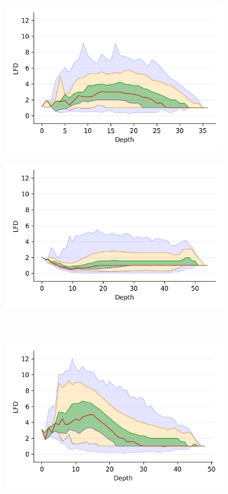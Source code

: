 \begin{figure}
    \captionsetup[subfigure]{aboveskip=-15pt,belowskip=-3pt}
    \begin{subfigure}[b]{0.47\textwidth}
        \includegraphics[width=0.9\textwidth]{images/lfd/fashion-mnist.png}\\
        \label{fig:results:fashion-mnist-lfd}
    \end{subfigure}%
    \begin{subfigure}[b]{0.47\textwidth}
        \includegraphics[width=0.9\textwidth]{images/lfd/glove-25.png}\\
        \label{fig:results:glove-25-lfd}
    \end{subfigure}
    \\
    \begin{subfigure}[b]{0.47\textwidth}
        \includegraphics[width=0.9\textwidth]{images/lfd/sift.png}\\

\end{subfigure}
\end{figure}
